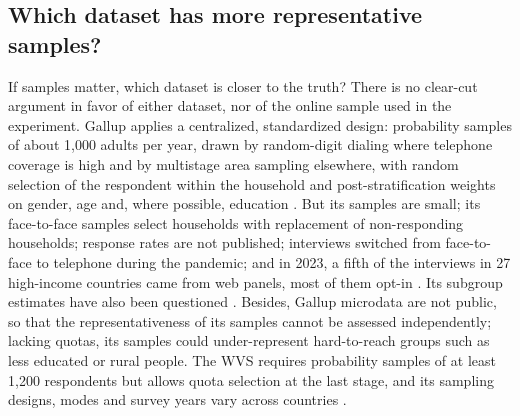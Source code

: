 \documentclass[12pt]{article}
\begin{document}
\subsection{Which dataset has more representative samples?}\label{subsec:data_quality}

If samples matter, which dataset is closer to the truth? There is no clear-cut argument in favor of either dataset, nor of the online sample used in the experiment. Gallup applies a centralized, standardized design: probability samples of about 1,000 adults per year, drawn by random-digit dialing where telephone coverage is high and by multistage area sampling elsewhere, with random selection of the respondent within the household and post-stratification weights on gender, age and, where possible, education \citep{gallup_methodology_2023}. But its samples are small; its face-to-face samples select households %
with replacement of non-responding households; response rates are not published; interviews switched from face-to-face to telephone during the pandemic; and in 2023, a fifth of the interviews in 27 high-income countries came from web panels, most of them opt-in \citep{gallup_methodology_2023}. Its subgroup estimates have also been questioned \citep{blanchflower_gallup_2024}. Besides, Gallup microdata are not public, so that the representativeness of its samples cannot be assessed independently; lacking quotas, its samples could under-represent hard-to-reach groups such as less educated or rural people. The WVS requires probability samples of at least 1,200 respondents but allows quota selection at the last stage, and its sampling designs, modes and survey years vary across countries \citep{wvs_rules_wave8}. %
\end{document}
